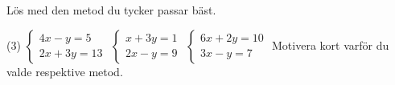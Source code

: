 Lös med den metod du tycker passar bäst.
\begin{delar}(3)
  \task $\begin{cases} 4x - y = 5 \\ 2x + 3y = 13 \end{cases}$
  \task $\begin{cases} x + 3y = 1 \\ 2x - y = 9 \end{cases}$
  \task $\begin{cases} 6x + 2y = 10 \\ 3x - y = 7 \end{cases}$
  \task* Motivera kort varför du valde respektive metod.
\end{delar}
